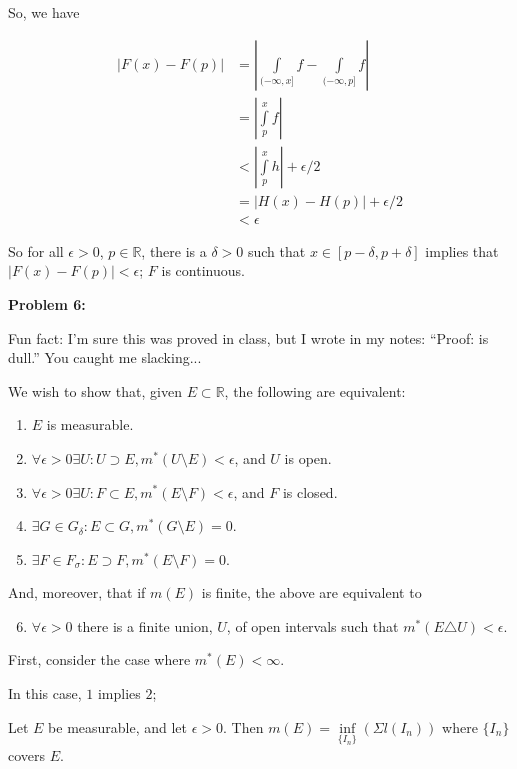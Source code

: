 \documentclass[a4paper,12pt]{article}
\newcommand{\tab}{\hspace{4mm}} %
\newcommand{\shunt}{\vspace{20mm}}
\newcommand{\absval}[1]{\left\lvert #1 \right\rvert}
\newcommand{\de}{\delta}
\newcommand{\ep}{\epsilon}
\newcommand{\si}{\sigma}
\newcommand{\R}{\mathbb{R}}
\begin{document}
So, we have

\begin{align*}
\absval{F(x)-F(p)} &= \absval{\int\limits_{(-\infty,x]} f - \int\limits_{(-\infty,p]} f} \\
&=\absval{\int\limits_p^x f} \\
&<\absval{\int\limits_p^x h} + \ep/2 \\
&=\absval{H(x)-H(p)} + \ep/2\\
&< \ep
\end{align*}

So for all $\ep>0$, $p \in \R$, there is a $\de >0$ such that $x \in [p-\de, p+\de]$ implies that $\absval{F(x)-F(p)} < \ep$; $F$ is continuous.

\shunt

{\bf Problem 6:} %

Fun fact: I'm sure this was proved in class, but I wrote in my notes: ``Proof: is dull.'' You caught me slacking...

We wish to show that, given $E \subset \R$, the following are equivalent:

\begin{enumerate}
\item $E$ is measurable.
\item $\forall \ep >0 \exists U: U \supset E, m^*(U \setminus E) < \ep$, and $U$ is open.
\item $\forall \ep >0 \exists U: F \subset E, m^*(E \setminus F) < \ep$, and $F$ is closed.
\item $\exists G \in G_\de : E \subset G, m^*(G \setminus E) = 0$.
\item $\exists F \in F_\si : E \supset F, m^*(E \setminus F) = 0$.
\end{enumerate}

And, moreover, that if $m(E)$ is finite, the above are equivalent to

\begin{enumerate}
\setcounter{enumi}{5}
\item $\forall \ep >0$ there is a finite union, $U$, of open intervals such that $m^*(E \triangle U) < \ep$.
\end{enumerate}

First, consider the case where $m^*(E) < \infty$.

In this case, $1$ implies $2$;

\tab Let $E$ be measurable, and let $\ep >0$. Then $m(E) = \inf\limits_{\{I_n\}}(\Sigma l(I_n))$ where $\{I_n\}$ covers $E$.
\end{document}
